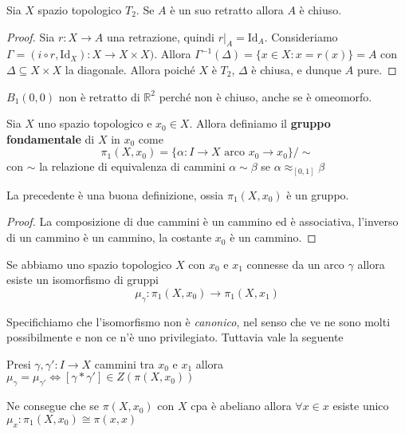 \begin{proposition}
    Sia \(X\) spazio topologico \(T_{2}\). Se \(A\) è un suo retratto allora
    \(A\) è chiuso.
\end{proposition}
\begin{proof}
    Sia \(r : X \to A\) una retrazione, quindi \(r|_A = \mathrm{Id}_A\).
    Consideriamo \(\Gamma  = {(i \circ r, \mathrm{Id}_X)} : X \to X \times X)\).
    Allora \(\Gamma^{-1} {(\Delta)} = \{x \in X : x = r{(x)}\} = A\) con
    \(\Delta \subseteq X \times X \) la diagonale. Allora poiché \(X\) è
    \(T_{2}\), \(\Delta\) è chiusa, e dunque \(A\) pure.
\end{proof}
\begin{example}
    \(B_{1}{(0,0)}\) non è retratto di \(\mathbb{R}^2\) perché non è chiuso,
    anche se è omeomorfo.
\end{example}

\begin{definition}
    Sia \(X\) uno spazio topologico e \(x_{0} \in X\). Allora definiamo il
    \textbf{gruppo fondamentale} di \(X\) in \(x_{0}\) come
    \[
      \pi_1{(X, x_{0})} = \{\alpha : I \to X \text{ arco } x_{0} \to
      x_{0}\} / \sim
    \]
    con \(\sim\) la relazione di equivalenza di cammini \(\alpha \sim \beta\) se
    \(\alpha \approx_{[0,1]} \beta \) 
\end{definition}
\begin{proposition}
    La precedente è una buona definizione, ossia \(\pi_{1}{(X, x_{0})}\) è un
    gruppo.
\end{proposition}
\begin{proof}
    La composizione di due cammini è un cammino ed è associativa, l'inverso di
    un cammino è un cammino, la costante \(x_{0}\) è un cammino.
\end{proof}

\begin{proposition}
Se abbiamo uno spazio topologico \(X\)  con \(x_{0}\) e \(x_{1}\) connesse da un
arco \(\gamma\) allora esiste un isomorfismo di gruppi
\[
  \mu_{\gamma} : \pi_{1}{(X, x_{0})} \to \pi_{1}{(X, x_{1})}
\]
\end{proposition}
Specifichiamo che l'isomorfismo non è \emph{canonico}, nel senso che ve ne sono
molti possibilmente e non ce n'è uno privilegiato. Tuttavia vale la seguente
\begin{eser}
    Presi \(\gamma, \gamma' : I \to X\) cammini tra \(x_{0}\) e \(x_{1}\) allora
    \(\mu_\gamma = \mu_{\gamma'} \iff [\gamma * \gamma'] \in Z(\pi{(X, x_{0})})\) 
\end{eser}
Ne consegue che se \(\pi{(X, x_{0})}\) con \(X\) cpa è abeliano allora \(\forall
x \in x\) esiste unico \(\mu_x : \pi_{1}{(X, x_{0})} \cong \pi{(x, x)}\) 

